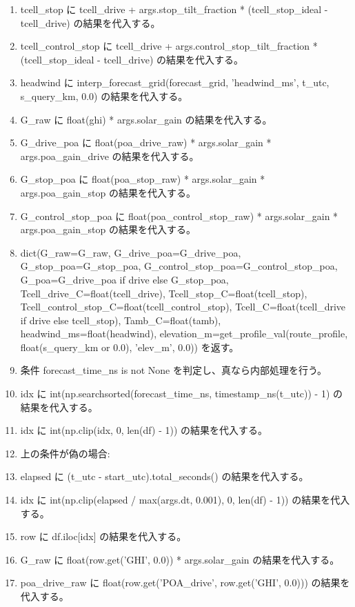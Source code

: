 \documentclass[a4paper,11pt]{article}
\begin{document}
\begin{enumerate}[leftmargin=1.8em]
\item   tcell\_stop に tcell\_drive + args.stop\_tilt\_fraction * (tcell\_stop\_ideal - tcell\_drive) の結果を代入する。
\item   tcell\_control\_stop に tcell\_drive + args.control\_stop\_tilt\_fraction * (tcell\_stop\_ideal - tcell\_drive) の結果を代入する。
\item   headwind に interp\_forecast\_grid(forecast\_grid, 'headwind\_ms', t\_utc, s\_query\_km, 0.0) の結果を代入する。
\item   G\_raw に float(ghi) * args.solar\_gain の結果を代入する。
\item   G\_drive\_poa に float(poa\_drive\_raw) * args.solar\_gain * args.poa\_gain\_drive の結果を代入する。
\item   G\_stop\_poa に float(poa\_stop\_raw) * args.solar\_gain * args.poa\_gain\_stop の結果を代入する。
\item   G\_control\_stop\_poa に float(poa\_control\_stop\_raw) * args.solar\_gain * args.poa\_gain\_stop の結果を代入する。
\item   dict(G\_raw=G\_raw, G\_drive\_poa=G\_drive\_poa, G\_stop\_poa=G\_stop\_poa, G\_control\_stop\_poa=G\_control\_stop\_poa, G\_poa=G\_drive\_poa if drive else G\_stop\_poa, Tcell\_drive\_C=float(tcell\_drive), Tcell\_stop\_C=float(tcell\_stop), Tcell\_control\_stop\_C=float(tcell\_control\_stop), Tcell\_C=float(tcell\_drive if drive else tcell\_stop), Tamb\_C=float(tamb), headwind\_ms=float(headwind), elevation\_m=get\_profile\_val(route\_profile, float(s\_query\_km or 0.0), 'elev\_m', 0.0)) を返す。
\item 条件 forecast\_time\_ns is not None を判定し、真なら内部処理を行う。
\item   idx に int(np.searchsorted(forecast\_time\_ns, timestamp\_ns(t\_utc)) - 1) の結果を代入する。
\item   idx に int(np.clip(idx, 0, len(df) - 1)) の結果を代入する。
\item   上の条件が偽の場合:
\item   elapsed に (t\_utc - start\_utc).total\_seconds() の結果を代入する。
\item   idx に int(np.clip(elapsed / max(args.dt, 0.001), 0, len(df) - 1)) の結果を代入する。
\item row に df.iloc[idx] の結果を代入する。
\item G\_raw に float(row.get('GHI', 0.0)) * args.solar\_gain の結果を代入する。
\item poa\_drive\_raw に float(row.get('POA\_drive', row.get('GHI', 0.0))) の結果を代入する。

\end{enumerate}
\end{document}
